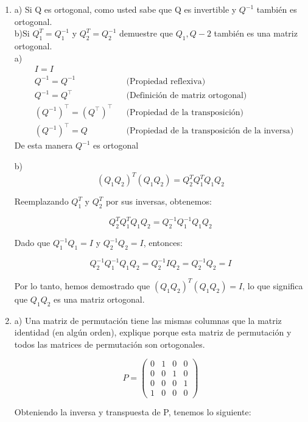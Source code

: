 \documentclass{report}
\begin{document}
\begin{enumerate}
    \begin{enumerate}
        \item a) Si Q es  ortogonal, como usted sabe que Q es invertible y $Q^{-1}$ también es ortogonal. \\
        b)Si $Q_1^{T}=Q_1^{-1}$ y $Q_2^{T}=Q_2^{-1}$ demuestre que $Q_1,Q-2$ también es una matriz ortogonal.
        \\
        a) \begin{align*}
        &I = I  \\
        &Q^{-1}  = Q^{-1} & &\text{(Propiedad reflexiva)} \\
        &Q^{-1}  = Q^\top & &\text{(Definición de matriz ortogonal)} \\
        &(Q^{-1})^\top  = (Q^\top)^\top & &\text{(Propiedad de la transposición)} \\
        &(Q^{-1})^\top = Q & &\text{(Propiedad de la transposición de la inversa)}
        \end{align*}
        De esta manera $Q^{-1}$ es ortogonal
            
        b) \[(Q_1 Q_2)^T (Q_1 Q_2) = Q_2^T Q_1^T Q_1 Q_2\]
    
    Reemplazando \( Q_1^T \) y \( Q_2^T \) por sus inversas, obtenemos:
    
    \[
    Q_2^T Q_1^T Q_1 Q_2 = Q_2^{-1} Q_1^{-1} Q_1 Q_2
    \]
    
    Dado que \( Q_1^{-1} Q_1 = I \) y \( Q_2^{-1} Q_2 = I \), entonces:
    
    \[
    Q_2^{-1} Q_1^{-1} Q_1 Q_2 = Q_2^{-1} I Q_2 = Q_2^{-1} Q_2 = I
    \]
    
    Por lo tanto, hemos demostrado que \( (Q_1 Q_2)^T (Q_1 Q_2) = I \), lo que significa que \( Q_1 Q_2 \) es una matriz ortogonal.
    
    \item a) Una matriz de permutación tiene las mismas columnas que la matriz identidad (en algún orden), explique porque esta matriz de permutación  y todos las matrices de permutación son ortogonales.
    
    $$P=\begin{pmatrix}
        0 & 1 & 0 & 0\\
        0 & 0 & 1 & 0\\
        0 & 0 & 0 & 1\\
        1 & 0 & 0 & 0 
    \end{pmatrix}$$
    
    Obteniendo la inversa y transpuesta de P, tenemos lo siguiente:
    

\end{enumerate}
\end{enumerate}
\end{document}
